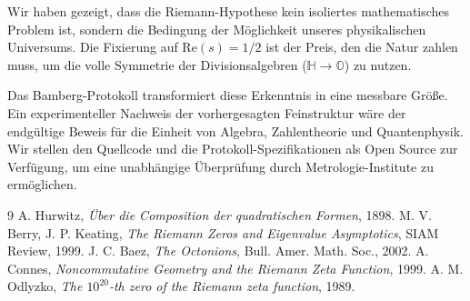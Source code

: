 \documentclass[11pt, a4paper]{article}
\begin{document}
	Wir haben gezeigt, dass die Riemann-Hypothese kein isoliertes mathematisches Problem ist, sondern die Bedingung der Möglichkeit unseres physikalischen Universums. Die Fixierung auf $\text{Re}(s)=1/2$ ist der Preis, den die Natur zahlen muss, um die volle Symmetrie der Divisionsalgebren ($\mathbb{H} \to \mathbb{O}$) zu nutzen.
	
	Das Bamberg-Protokoll transformiert diese Erkenntnis in eine messbare Größe. Ein experimenteller Nachweis der vorhergesagten Feinstruktur wäre der endgültige Beweis für die Einheit von Algebra, Zahlentheorie und Quantenphysik.
	Wir stellen den Quellcode und die Protokoll-Spezifikationen als Open Source zur Verfügung, um eine unabhängige Überprüfung durch Metrologie-Institute zu ermöglichen.
	
	\begin{thebibliography}{9}
		 A. Hurwitz, \textit{Über die Composition der quadratischen Formen}, 1898.
		 M. V. Berry, J. P. Keating, \textit{The Riemann Zeros and Eigenvalue Asymptotics}, SIAM Review, 1999.
		 J. C. Baez, \textit{The Octonions}, Bull. Amer. Math. Soc., 2002.
		 A. Connes, \textit{Noncommutative Geometry and the Riemann Zeta Function}, 1999.
		 A. M. Odlyzko, \textit{The $10^{20}$-th zero of the Riemann zeta function}, 1989.
	\end{thebibliography}
	
\end{document}
